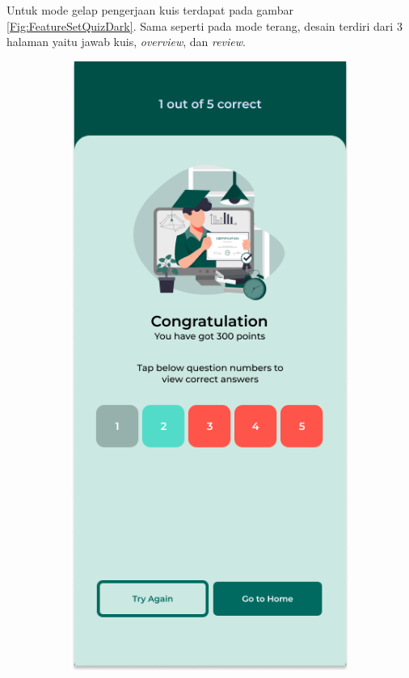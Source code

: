 Untuk mode gelap pengerjaan kuis terdapat pada gambar \ref*{Fig:FeatureSetQuizDark}.
Sama seperti pada mode terang, desain terdiri dari 3 halaman yaitu jawab kuis, \textit{overview}, dan \textit{review}.
\begin{figure}[H]
	\centering
	\begin{subfigure}[b]{0.23\textwidth}
		\centering
	  \includegraphics[width=\linewidth]{contents/chapter-3/images/HF-result.png}

\end{subfigure}
\end{figure}

